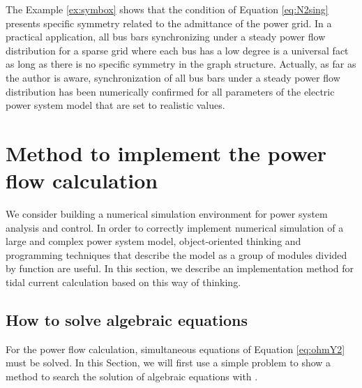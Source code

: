 \documentclass[graybox, envcountchap]{svmult}
\begin{document}
The Example \ref{ex:symbox} shows that the condition of Equation \ref{eq:N2sing} presents specific symmetry related to the admittance of the power grid.
In a practical application, all bus bars synchronizing under a steady power flow distribution for a sparse grid where each bus has a low degree is a universal fact as long as there is no specific symmetry in the graph structure.
Actually, as far as the author is aware, synchronization of all bus bars under a steady power flow distribution has been numerically confirmed for all parameters of the electric power system model that are set to realistic values. 


\section{Method to implement the power flow calculation}\label{sec:powfcal}
We consider building a numerical simulation environment for power system analysis and control.
In order to correctly implement numerical simulation of a large and complex power system model, object-oriented thinking and programming techniques that describe the model as a group of modules divided by function are useful.
In this section, we describe an implementation method for tidal current calculation based on this way of thinking.


\subsection{How to solve algebraic equations}
For the power flow calculation, simultaneous equations of Equation \ref{eq:ohmY2} must be solved.
In this Section, we will first use a simple problem to show a method to search the solution of algebraic equations with \matlab.
\end{document}
